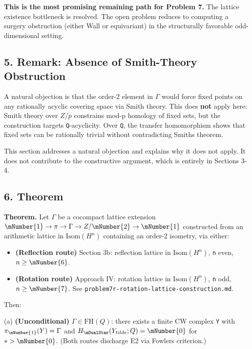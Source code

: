 \textbf{This is the most promising remaining path for Problem 7.} The lattice
existence bottleneck is resolved. The open problem reduces to computing a
surgery obstruction (either Wall or equivariant) in the structurally
favorable odd-dimensional setting.

\hypertarget{5-remark-absence-of-smith-theory-obstruction}{%
\subsection{5. Remark: Absence of Smith-Theory Obstruction}\label{5-remark-absence-of-smith-theory-obstruction}}

A natural objection is that the order-2 element in \(\Gamma\) would force fixed
points on any rationally acyclic covering space via Smith theory. This does
\textbf{not} apply here: Smith theory over \(Z/p\) constrains mod-p homology of
fixed sets, but the construction targets \texttt{Q}-acyclicity. Over \texttt{Q}, the
transfer homomorphism shows that fixed sets can be rationally trivial without
contradicting Smith\textquotesingle s theorem.

This section addresses a natural objection and explains why it does not
apply. It does not contribute to the constructive argument, which is entirely
in Sections 3-4.

\hypertarget{6-theorem}{%
\subsection{6. Theorem}\label{6-theorem}}

\textbf{Theorem.} Let \(\Gamma\) be a cocompact lattice extension
\(\mNumber{1} \to \pi \to \Gamma \to Z/\mNumber{2} \to \mNumber{1}\) constructed from an arithmetic lattice in
\(\mathup{Isom}(H^{n})\) containing an order-2 isometry, via either:

\begin{itemize}
\tightlist
\item
  \textbf{(Reflection route)} Section 3b: reflection lattice in \(\mathup{Isom}(H^{n})\),
  \texttt{n} even, \(n \ge \mNumber{6}\).
\item
  \textbf{(Rotation route)} Approach IV: rotation lattice in \(\mathup{Isom}(H^{n})\),
  \texttt{n} odd, \(n \ge \mNumber{7}\). See \texttt{problem7r-rotation-lattice-construction.md}.
\end{itemize}

Then:

(a) \textbf{(Unconditional)} \(\Gamma \in \mathup{FH}(Q)\): there exists a finite CW complex
\texttt{Y} with \(\pi_\mNumber{1}(Y) = \Gamma\) and \(H_{\mDualStar}(Y_{tilde}; Q) = \mNumber{0}\) for \(* > \mNumber{0}\).
(Both routes discharge E2 via Fowler\textquotesingle s criterion.)

